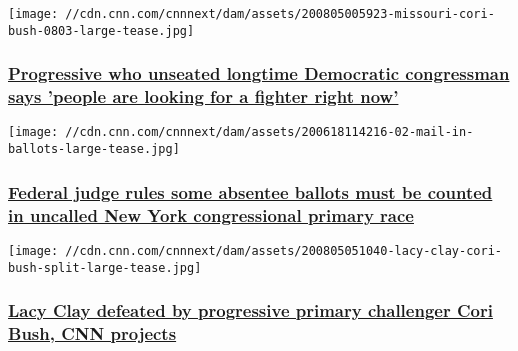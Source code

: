 \href{/2020/08/05/politics/cori-bush-william-lacy-clay-cnntv/index.html}{}

\texttt{[image: //cdn.cnn.com/cnnnext/dam/assets/200805005923-missouri-cori-bush-0803-large-tease.jpg]}

\hypertarget{progressive-who-unseated-longtime-democratic-congressman-says-people-are-looking-for-a-fighter-right-now}{%
\subsubsection{\texorpdfstring{\href{/2020/08/05/politics/cori-bush-william-lacy-clay-cnntv/index.html}{Progressive
who unseated longtime Democratic congressman says 'people are looking
for a fighter right
now'}}{Progressive who unseated longtime Democratic congressman says 'people are looking for a fighter right now'}}\label{progressive-who-unseated-longtime-democratic-congressman-says-people-are-looking-for-a-fighter-right-now}}

\href{/2020/08/04/politics/federal-judge-absentee-ballots-new-york/index.html}{}

\texttt{[image: //cdn.cnn.com/cnnnext/dam/assets/200618114216-02-mail-in-ballots-large-tease.jpg]}

\hypertarget{federal-judge-rules-some-absentee-ballots-must-be-counted-in-uncalled-new-york-congressional-primary-race}{%
\subsubsection{\texorpdfstring{\href{/2020/08/04/politics/federal-judge-absentee-ballots-new-york/index.html}{Federal
judge rules some absentee ballots must be counted in uncalled New York
congressional primary
race}}{Federal judge rules some absentee ballots must be counted in uncalled New York congressional primary race}}\label{federal-judge-rules-some-absentee-ballots-must-be-counted-in-uncalled-new-york-congressional-primary-race}}

\href{/2020/08/05/politics/cori-bush-defeats-lacy-clay-missouri-result/index.html}{}

\texttt{[image: //cdn.cnn.com/cnnnext/dam/assets/200805051040-lacy-clay-cori-bush-split-large-tease.jpg]}

\hypertarget{lacy-clay-defeated-by-progressive-primary-challenger-cori-bush-cnn-projects}{%
\subsubsection{\texorpdfstring{\href{/2020/08/05/politics/cori-bush-defeats-lacy-clay-missouri-result/index.html}{Lacy
Clay defeated by progressive primary challenger Cori Bush, CNN
projects}}{Lacy Clay defeated by progressive primary challenger Cori Bush, CNN projects}}\label{lacy-clay-defeated-by-progressive-primary-challenger-cori-bush-cnn-projects}}

